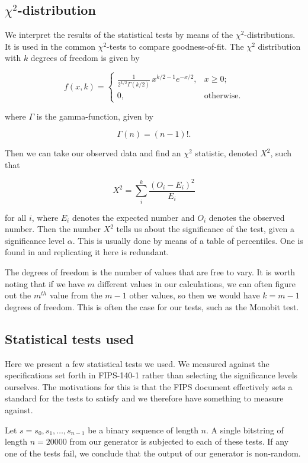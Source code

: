 \documentclass[a4paper]{article}           %
\begin{document}
\subsection{$\chi^2$-distribution}

We interpret the results of the statistical tests by means of the $\chi^2$-distributions. It is used in the common $\chi^2$-tests to compare goodness-of-fit. The $\chi^2$ distribution with $k$ degrees of freedom is given by

\[
f(x, k) =
\begin{cases}
  \frac{1}{2^{k/2}\Gamma(k/2)}\,x^{k/2 - 1} e^{-x/2},  & x \geq 0; \\ 0, & \text{otherwise}.
\end{cases}
\]

where $\Gamma$ is the gamma-function, given by

\[
\Gamma(n) = (n-1)!.
\]

Then we can take our observed data and find an $\chi^2$ statistic, denoted $X^2$, such that

\[
X^2 = \sum_i^k \frac{(O_i - E_i)^2}{E_i}
\]

for all $i$, where $E_i$ denotes the expected number and $O_i$ denotes the observed number. Then the number $X^2$ tells us about the significance of the test, given a significance level $\alpha$. This is usually done by means of a table of percentiles. One is found in \cite[p. 178]{menezes1996} and replicating it here is redundant. 

The degrees of freedom is the number of values that are free to vary. It is worth noting that if we have $m$ different values in our calculations, we can often figure out the $m^{th}$ value from the $m-1$ other values, so then we would have $k=m-1$ degrees of freedom. This is often the case for our tests, such as the Monobit test. 

\subsection{Statistical tests used}

 Here we present a few statistical tests we used. We measured against the specifications set forth in FIPS-140-1\cite{fips140, menezes1996} rather than selecting the significance levels ourselves. The motivations for this is that the FIPS document effectively sets a standard for the tests to satisfy and we therefore have something to measure against. 

Let $s = s_0, s_1, \ldots, s_{n-1}$ be a binary sequence of length $n$. A single bitstring of length $n = 20000$ from our generator is subjected to each of these tests. If any one of the tests fail, we conclude that the output of our generator is non-random. 
\end{document}
